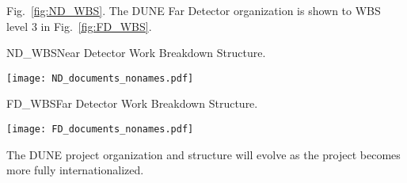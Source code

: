 Fig.~\ref{fig:ND_WBS}.
The DUNE Far Detector organization is shown to WBS level 3 in 
Fig.~\ref{fig:FD_WBS}.
\begin{cdrfigure}{ND_WBS}{Near Detector Work Breakdown Structure.}
\centering
\begin{center}
\texttt{[image: ND\_documents\_nonames.pdf]}
\end{center}
\end{cdrfigure}
\begin{cdrfigure}{FD_WBS}{Far Detector Work Breakdown Structure.}
\centering
\begin{center}
\texttt{[image: FD\_documents\_nonames.pdf]}
\end{center}
\end{cdrfigure}
The DUNE project organization and structure will evolve as the project
becomes more fully internationalized.
